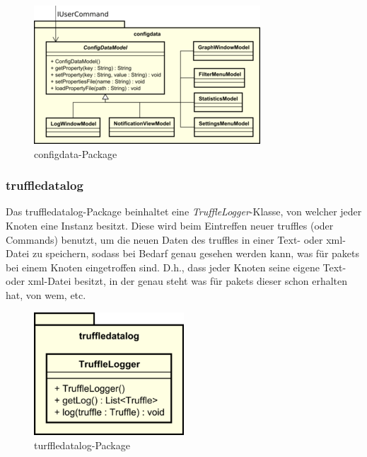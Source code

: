     \begin{figure}[H]
      \centering
      \includegraphics[width=\textwidth]{../diagramimages/configdata.png}
      \caption{configdata-Package}
    \end{figure}


    \subsubsection{truffledatalog}
    \label{subsubsec:graphlog}

    Das truffledatalog-Package beinhaltet eine \textit{TruffleLogger}-Klasse, von
    welcher jeder Knoten eine Instanz besitzt. Diese wird beim Eintreffen neuer \glspl{truffle}
    (oder Commands) benutzt, um die neuen Daten des \glspl{truffle} in einer Text- oder xml-Datei zu speichern,
    sodass bei Bedarf genau gesehen werden kann, was für \glspl{paket} bei einem
    Knoten eingetroffen sind. D.h., dass jeder Knoten seine eigene Text- oder xml-Datei
    besitzt, in der genau steht was für \glspl{paket} dieser schon erhalten hat,
    von wem, etc.

    \begin{figure}[H]
      \centering
      \includegraphics[width=0.5\textwidth]{../diagramimages/truffledatalog.png}
      \caption{turffledatalog-Package}
    \end{figure}
